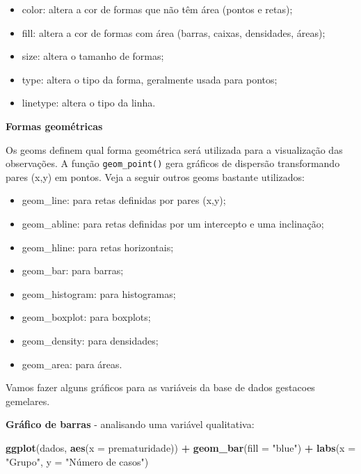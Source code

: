 \documentclass[
]{book}
\newenvironment{Shaded}{\begin{snugshade}}{\end{snugshade}}
\newcommand{\DataTypeTok}[1]{\textcolor[rgb]{0.13,0.29,0.53}{#1}}
\newcommand{\KeywordTok}[1]{\textcolor[rgb]{0.13,0.29,0.53}{\textbf{#1}}}
\newcommand{\NormalTok}[1]{#1}
\newcommand{\OperatorTok}[1]{\textcolor[rgb]{0.81,0.36,0.00}{\textbf{#1}}}
\newcommand{\StringTok}[1]{\textcolor[rgb]{0.31,0.60,0.02}{#1}}
\begin{document}
\begin{itemize}
\item
  color: altera a cor de formas que não têm área (pontos e retas);
\item
  fill: altera a cor de formas com área (barras, caixas, densidades, áreas);
\item
  size: altera o tamanho de formas;
\item
  type: altera o tipo da forma, geralmente usada para pontos;
\item
  linetype: altera o tipo da linha.
\end{itemize}

\textbf{Formas geométricas}

Os geoms definem qual forma geométrica será utilizada para a visualização das observações. A função \texttt{geom\_point()} gera gráficos de dispersão transformando pares (x,y) em pontos. Veja a seguir outros geoms bastante utilizados:

\begin{itemize}
\item
  geom\_line: para retas definidas por pares (x,y);
\item
  geom\_abline: para retas definidas por um intercepto e uma inclinação;
\item
  geom\_hline: para retas horizontais;
\item
  geom\_bar: para barras;
\item
  geom\_histogram: para histogramas;
\item
  geom\_boxplot: para boxplots;
\item
  geom\_density: para densidades;
\item
  geom\_area: para áreas.
\end{itemize}

Vamos fazer alguns gráficos para as variáveis da base de dados gestacoes gemelares.

\textbf{Gráfico de barras} - analisando uma variável qualitativa:

\begin{Shaded}
\begin{Highlighting}[]
\KeywordTok{ggplot}\NormalTok{(dados, }\KeywordTok{aes}\NormalTok{(}\DataTypeTok{x =}\NormalTok{ prematuridade)) }\OperatorTok{+}
\StringTok{  }\KeywordTok{geom_bar}\NormalTok{(}\DataTypeTok{fill =} \StringTok{"blue"}\NormalTok{) }\OperatorTok{+}
\StringTok{  }\KeywordTok{labs}\NormalTok{(}\DataTypeTok{x =} \StringTok{"Grupo"}\NormalTok{, }\DataTypeTok{y =} \StringTok{"Número de casos"}\NormalTok{)}
\end{Highlighting}
\end{Shaded}
\end{document}
